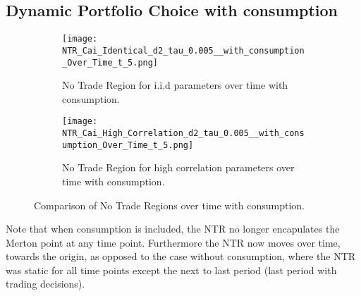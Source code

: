 \documentclass[11pt]{article}
\begin{document}
\subsection{Dynamic Portfolio Choice with consumption} \label{Subsection: Results_WithConsumption}

\begin{figure}[!ht]
    \centering
    \begin{subfigure}[t]{0.48\textwidth}
        \centering
        \texttt{[image: NTR\_Cai\_Identical\_d2\_tau\_0.005\_\_with\_consumption\_Over\_Time\_t\_5.png]}
        \caption{No Trade Region for i.i.d parameters over time with consumption.}
        \label{fig:NTR_2d_iid_with_consumption_over_time}
    \end{subfigure}%
    \hfill
    \begin{subfigure}[t]{0.48\textwidth}
        \centering
        \texttt{[image: NTR\_Cai\_High\_Correlation\_d2\_tau\_0.005\_\_with\_consumption\_Over\_Time\_t\_5.png]}
        \caption{No Trade Region for high correlation parameters over time with consumption.}
        \label{fig:NTR_2d_high_correlation_with_consumption_over_time}
    \end{subfigure}

    \caption{Comparison of No Trade Regions over time with consumption.}

\end{figure}

Note that when consumption is included, the \ac{NTR} no longer encapulates the Merton point at any time point.
Furthermore the \ac{NTR} now moves over time, towards the origin, as opposed to the case without consumption,
where the \ac{NTR} was static for all time points except the next to last period (last period with trading decisions).

\ifdefined\COMPILINGMAIN
\else
\end{document}
